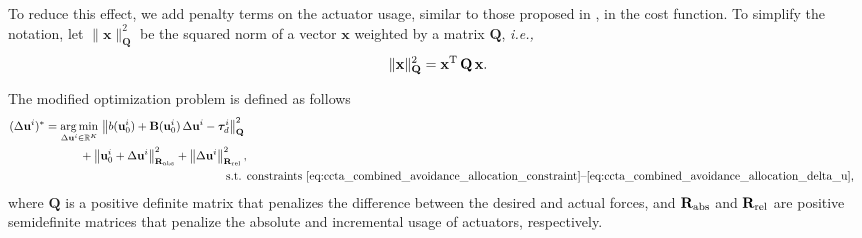 To reduce this effect, we add penalty terms on the actuator usage, similar to those proposed in \cite{johansen_constrained_2004}, in the cost function.
To simplify the notation, let $\|\mathbf{x}\|_{\mathbf{Q}}^2$ be the squared norm of a vector $\mathbf{x}$ weighted by a matrix $\mathbf{Q}$, \emph{i.e.,}
\begin{equation}
    \|\mathbf{x}\|_{\mathbf{Q}}^2 = \mathbf{x}^{\rm T}\,\mathbf{Q}\,\mathbf{x}.
\end{equation}

The modified optimization problem is defined as follows
\begin{subequations}
    \begin{align}
    \begin{split}
        (\Delta\mathbf{u}^{i})^* &= \operatorname*{arg\,min}_{\Delta\mathbf{u}^{i}\in\mathbb{R}^{K}}\,\left\| b(\mathbf{u}^{i}_{0}) + \mathbf{B}(\mathbf{u}^{i}_{0})\,\Delta\mathbf{u}^{i} - \bm{\tau}^{i}_{d} \right\|_{\mathbf{Q}}^2 \\
        &\quad \quad \quad + \left\| \mathbf{u}^{i}_{0} + \Delta\mathbf{u}^{i} \right\|_{\mathbf{R}_{\rm abs}}^2 + \left\|\Delta\mathbf{u}^{i}\right\|_{\mathbf{R}_{\rm rel}}^2,
    \end{split} \\    
    \text{s.t. }&\text{constraints \eqref{eq:ccta_combined_avoidance_allocation_constraint}--\eqref{eq:ccta_combined_avoidance_allocation_delta_u},}
    \end{align}
    \label{eq:ccta_combined_avoidance_allocation_modified}
\end{subequations}
\noindent where $\mathbf{Q}$ is a positive definite matrix that penalizes the difference between the desired and actual forces, and $\mathbf{R}_{\rm abs}$ and $\mathbf{R}_{\rm rel}$ are positive semidefinite matrices that penalize the absolute and incremental usage of actuators, respectively.

